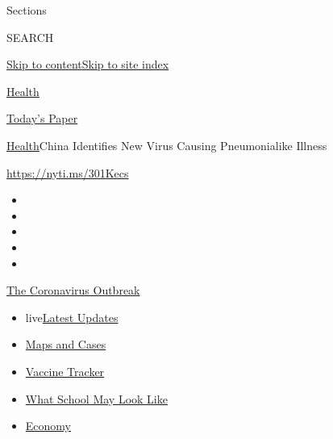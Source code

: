 Sections

SEARCH

\protect\hyperlink{site-content}{Skip to
content}\protect\hyperlink{site-index}{Skip to site index}

\href{https://www.nytimes.com/section/health}{Health}

\href{https://myaccount.nytimes.com/auth/login?response_type=cookie\&client_id=vi}{}

\href{https://www.nytimes.com/section/todayspaper}{Today's Paper}

\href{/section/health}{Health}\textbar{}China Identifies New Virus
Causing Pneumonialike Illness

\url{https://nyti.ms/301Kecs}

\begin{itemize}
\item
\item
\item
\item
\item
\end{itemize}

\href{https://www.nytimes.com/news-event/coronavirus?action=click\&pgtype=Article\&state=default\&region=TOP_BANNER\&context=storylines_menu}{The
Coronavirus Outbreak}

\begin{itemize}
\tightlist
\item
  live\href{https://www.nytimes.com/2020/08/02/world/coronavirus-updates.html?action=click\&pgtype=Article\&state=default\&region=TOP_BANNER\&context=storylines_menu}{Latest
  Updates}
\item
  \href{https://www.nytimes.com/interactive/2020/us/coronavirus-us-cases.html?action=click\&pgtype=Article\&state=default\&region=TOP_BANNER\&context=storylines_menu}{Maps
  and Cases}
\item
  \href{https://www.nytimes.com/interactive/2020/science/coronavirus-vaccine-tracker.html?action=click\&pgtype=Article\&state=default\&region=TOP_BANNER\&context=storylines_menu}{Vaccine
  Tracker}
\item
  \href{https://www.nytimes.com/interactive/2020/07/29/us/schools-reopening-coronavirus.html?action=click\&pgtype=Article\&state=default\&region=TOP_BANNER\&context=storylines_menu}{What
  School May Look Like}
\item
  \href{https://www.nytimes.com/live/2020/07/31/business/stock-market-today-coronavirus?action=click\&pgtype=Article\&state=default\&region=TOP_BANNER\&context=storylines_menu}{Economy}
\end{itemize}

